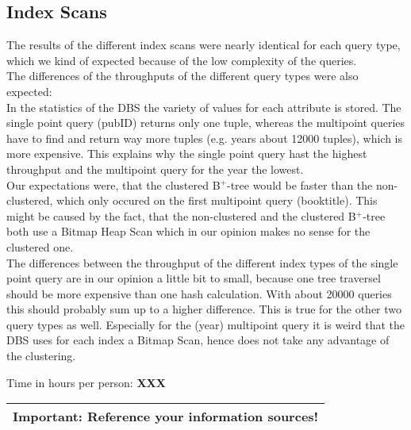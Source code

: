 \documentclass[11pt]{scrartcl}
\begin{document}
\subsection{Index Scans}
The results of the different index scans were nearly identical for each query type, which we kind of expected because of the low complexity of the queries.\\
The differences of the throughputs of the different query types were also expected:\\
In the statistics of the DBS the variety of values for each attribute is stored. The single point query (pubID) returns only one tuple, whereas the multipoint queries have to find and return way more tuples (e.g. years about 12000 tuples), which is more expensive. This explains why the single point query hast the highest throughput and the multipoint query for the year the lowest.\\
Our expectations were, that the clustered B$^+$-tree would be faster than the non-clustered, which only occured on the first multipoint query (booktitle). This might be caused by the fact, that the non-clustered and the clustered B$^+$-tree both use a Bitmap Heap Scan which in our opinion makes no sense for the clustered one.\\
The differences between the throughput of the different index types of the single point query are in our opinion a little bit to small, because one tree traversel should be more expensive than one hash calculation. With about 20000 queries this should probably sum up to a higher difference. This is true for the other two query types as well. Especially for the (year) multipoint query it is weird that the DBS uses for each index a Bitmap Scan, hence does not take any advantage of the clustering.

\bigskip

\noindent Time in hours per person: {\bf XXX}

\bigskip

\begin{center}
  \begin{tabular}{c}
    \hline
    {\bf Important:} Reference your information sources!
    \\\hline
  \end{tabular}
\end{center}
\end{document}
